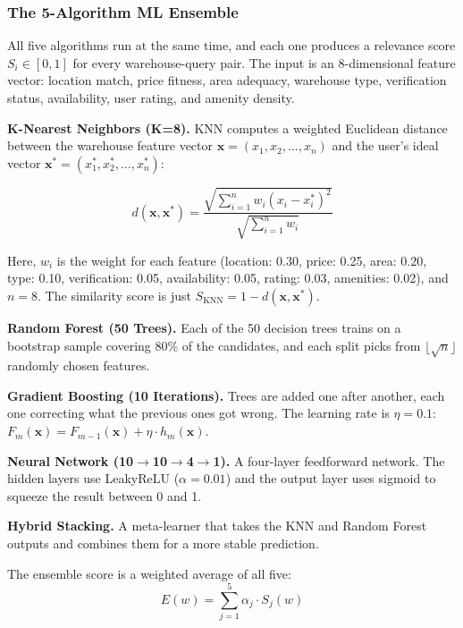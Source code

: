 \documentclass[conference]{IEEEtran}
\begin{document}
\subsubsection{The 5-Algorithm ML Ensemble}
All five algorithms run at the same time, and each one produces a relevance score $S_i \in [0, 1]$ for every warehouse-query pair. The input is an 8-dimensional feature vector: location match, price fitness, area adequacy, warehouse type, verification status, availability, user rating, and amenity density.

\textbf{K-Nearest Neighbors (K=8).} KNN computes a weighted Euclidean distance between the warehouse feature vector $\mathbf{x} = (x_1, x_2, \ldots, x_n)$ and the user's ideal vector $\mathbf{x}^* = (x_1^*, x_2^*, \ldots, x_n^*)$:

\begin{equation}
d(\mathbf{x}, \mathbf{x}^*) = \frac{\sqrt{\sum_{i=1}^{n} w_i \left(x_i - x_i^*\right)^2}}{\sqrt{\sum_{i=1}^{n} w_i}}
\label{eq:knn}
\end{equation}

\noindent Here, $w_i$ is the weight for each feature (location: 0.30, price: 0.25, area: 0.20, type: 0.10, verification: 0.05, availability: 0.05, rating: 0.03, amenities: 0.02), and $n = 8$. The similarity score is just $S_{\text{KNN}} = 1 - d(\mathbf{x}, \mathbf{x}^*)$.

\textbf{Random Forest (50 Trees).} Each of the 50 decision trees trains on a bootstrap sample covering 80\% of the candidates, and each split picks from $\lfloor\sqrt{n}\rfloor$ randomly chosen features.

\textbf{Gradient Boosting (10 Iterations).} Trees are added one after another, each one correcting what the previous ones got wrong. The learning rate is $\eta = 0.1$:
$F_m(\mathbf{x}) = F_{m-1}(\mathbf{x}) + \eta \cdot h_m(\mathbf{x})$.

\textbf{Neural Network (10$\rightarrow$10$\rightarrow$4$\rightarrow$1).} A four-layer feedforward network. The hidden layers use LeakyReLU ($\alpha = 0.01$) and the output layer uses sigmoid to squeeze the result between 0 and 1.

\textbf{Hybrid Stacking.} A meta-learner that takes the KNN and Random Forest outputs and combines them for a more stable prediction.

The ensemble score is a weighted average of all five:
\begin{equation}
E(w) = \sum_{j=1}^{5} \alpha_j \cdot S_j(w)
\label{eq:ensemble}
\end{equation}
\end{document}
